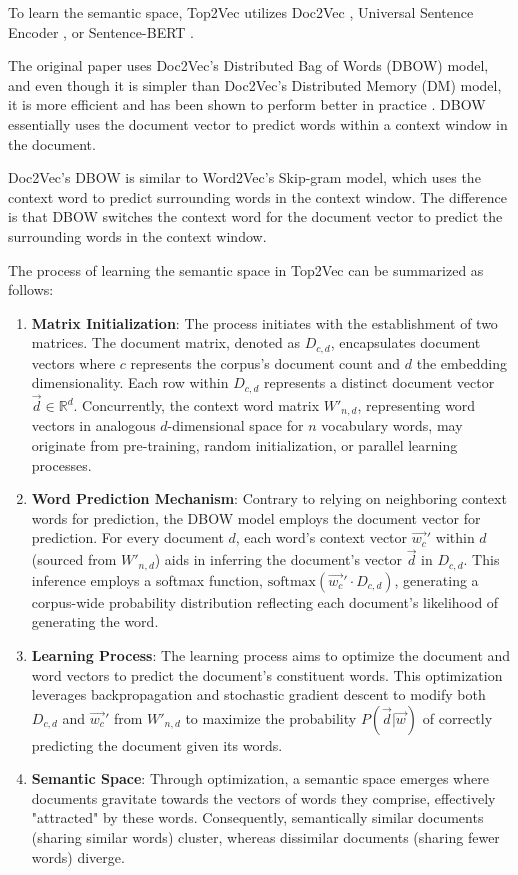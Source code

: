 \documentclass{article}
\begin{document}
To learn the semantic space, Top2Vec utilizes Doc2Vec \cite{le_distributed_2014, rehurek_software_2010}, Universal Sentence Encoder \cite{cer_universal_2018}, or Sentence-BERT \cite{reimers_sentence-bert_2019}.

The original paper uses Doc2Vec's Distributed Bag of Words (DBOW) model, and even though it is simpler than Doc2Vec's Distributed Memory (DM) model, it is more efficient and has been shown to perform better in practice \cite{lau_empirical_2016}. DBOW essentially uses the document vector to predict words within a context window in the document.

Doc2Vec's DBOW is similar to Word2Vec's Skip-gram model, which uses the context word to predict surrounding words in the context window. The difference is that DBOW switches the context word for the document vector to predict the surrounding words in the context window.

The process of learning the semantic space in Top2Vec can be summarized as follows:
\begin{enumerate}
    \item \textbf{Matrix Initialization}: The process initiates with the establishment of two matrices. The document matrix, denoted as $D_{c,d}$, encapsulates document vectors where $c$ represents the corpus's document count and $d$ the embedding dimensionality. Each row within $D_{c,d}$ represents a distinct document vector $\vec{d} \in \mathbb{R}^d$. Concurrently, the context word matrix $W'_{n,d}$, representing word vectors in analogous $d$-dimensional space for $n$ vocabulary words, may originate from pre-training, random initialization, or parallel learning processes.

    \item \textbf{Word Prediction Mechanism}: Contrary to relying on neighboring context words for prediction, the DBOW model employs the document vector for prediction. For every document $d$, each word's context vector $\vec{w_c}'$ within $d$ (sourced from $W'_{n,d}$) aids in inferring the document's vector $\vec{d}$ in $D_{c,d}$. This inference employs a softmax function, $\text{softmax}(\vec{w_c}' \cdot D_{c,d})$, generating a corpus-wide probability distribution reflecting each document's likelihood of generating the word.

    \item \textbf{Learning Process}: The learning process aims to optimize the document and word vectors to predict the document's constituent words. This optimization leverages backpropagation and stochastic gradient descent to modify both $D_{c,d}$ and $\vec{w_c}'$ from $W'_{n,d}$ to maximize the probability $P(\vec{d} | \vec{w})$ of correctly predicting the document given its words.

    \item \textbf{Semantic Space}: Through optimization, a semantic space emerges where documents gravitate towards the vectors of words they comprise, effectively "attracted" by these words. Consequently, semantically similar documents (sharing similar words) cluster, whereas dissimilar documents (sharing fewer words) diverge.
\end{enumerate}
\end{document}
